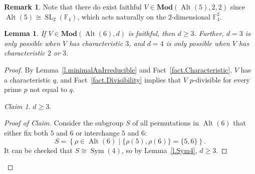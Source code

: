 \documentclass[a4paper, 11pt]{amsart}
\theoremstyle{plain}
\newtheorem{lemma}[theorem]{Lemma}
\theoremstyle{definition}
\newtheorem{remark}[theorem]{Remark}
\theoremstyle{remark}
\newtheorem{claim}{Claim}
\newenvironment{proofclaim}[1][Proof of Claim]{\begin{proof}[#1]\renewcommand{\qedsymbol}{$\lozenge$}}{\end{proof}}
\DeclareMathOperator{\Sym}{Sym}
\DeclareMathOperator{\Alt}{Alt}
\DeclareMathOperator{\SL}{SL}
\newcommand{\Mod}{\mathbf{Mod}}
\newcommand{\bF}{\mathbb{F}}
\begin{document}
\begin{remark}
    Note that there do exist faithful $V \in \Mod(\Alt(5), 2, 2)$ since $\Alt(5) \cong \SL_2(\bF_4)$, which acts naturally on the $2$-dimensional $\bF_4^2$.
\end{remark}

\begin{lemma}\label{l.Alt6}
If $V \in \Mod(\Alt(6), d)$ is faithful, then $d \ge 3$. Further, $d=3$ is only possible when $V$ has characteristic $3$, and $d=4$ is only possible when $V$ has characteristic $2$ or $3$.
\end{lemma}
\begin{proof}
By Lemma~\ref{l.minimalAnIrreducible} and Fact~\ref{fact.Characteristic}, $V$ has a characteristic $q$, and Fact~\ref{fact.Divisibility} implies that $V$ $p$-divisible for every prime $p$ not equal to $q$.

\begin{claim}\label{l.Alt6:cl:dAtLeast3}
$d \ge 3$.
\end{claim}
\begin{proofclaim}
Consider the subgroup $S$ of all permutations in $\Alt(6)$ that either fix both $5$ and $6$ or interchange $5$ and $6$:
\[
S=\left\{ \rho\in\Alt(6)\mid \{\rho(5),\rho(6)\} = \{5,6\}\right\}.
\]
It can be checked that  $S\cong \Sym(4)$, so by Lemma~\ref{l.Sym4}, $d\ge 3$.
\end{proofclaim}




\end{proof}
\end{document}
